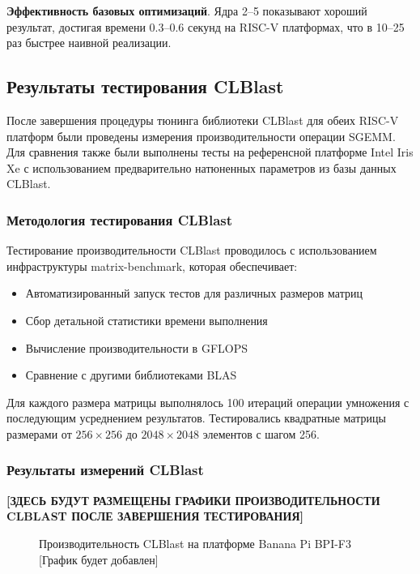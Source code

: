 \textbf{Эффективность базовых оптимизаций}. Ядра 2--5 показывают хороший результат, достигая времени 0.3--0.6 секунд на RISC-V платформах, что в 10--25 раз быстрее наивной реализации.

\subsection{Результаты тестирования CLBlast}

После завершения процедуры тюнинга библиотеки CLBlast для обеих RISC-V платформ были проведены измерения производительности операции SGEMM. Для сравнения также были выполнены тесты на референсной платформе Intel Iris Xe с использованием предварительно натюненных параметров из базы данных CLBlast.

\subsubsection{Методология тестирования CLBlast}

Тестирование производительности CLBlast проводилось с использованием инфраструктуры matrix-benchmark, которая обеспечивает:

\begin{itemize}
    \item Автоматизированный запуск тестов для различных размеров матриц
    \item Сбор детальной статистики времени выполнения
    \item Вычисление производительности в GFLOPS
    \item Сравнение с другими библиотеками BLAS
\end{itemize}

Для каждого размера матрицы выполнялось 100 итераций операции умножения с последующим усреднением результатов. Тестировались квадратные матрицы размерами от $256 \times 256$ до $2048 \times 2048$ элементов с шагом 256.

\subsubsection{Результаты измерений CLBlast}

\textbf{[ЗДЕСЬ БУДУТ РАЗМЕЩЕНЫ ГРАФИКИ ПРОИЗВОДИТЕЛЬНОСТИ CLBLAST ПОСЛЕ ЗАВЕРШЕНИЯ ТЕСТИРОВАНИЯ]}

\begin{figure}[H]
\centering
\caption{Производительность CLBlast на платформе Banana Pi BPI-F3 [График будет добавлен]}
\label{fig:clblast_bananapi}
\end{figure}

